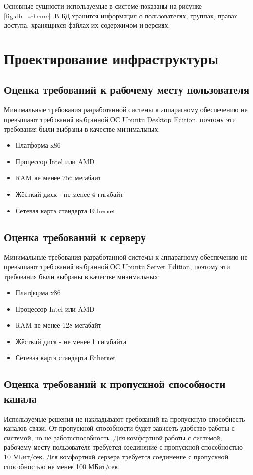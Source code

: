 \documentclass[utf8,usehyperref,12pt]{G7-32}
\begin{document}
Основные сущности используемые в системе показаны на рисунке \ref{fig:db_scheme}. В БД хранится информация о пользователях, группах, правах доступа, хранящихся файлах их содержимом и версиях.


\section{Проектирование инфраструктуры}\label{sect_infra}

\subsection{Оценка требований к рабочему месту пользователя}\label{sect_infra}
Минимальные требования разработанной системы к аппаратному обеспечению не превышают требований выбранной ОС Ubuntu Desktop Edition\cite{ubuntu_req}, поэтому эти требования были выбраны в качестве минимальных:
\begin{itemize}
 \item Платформа x86
 \item Процессор Intel или AMD
 \item RAM не менее 256 мегабайт
 \item Жёсткий диск - не менее 4 гигабайт
 \item Сетевая карта стандарта Ethernet
\end{itemize}

\subsection{Оценка требований к серверу}\label{sect_infra}

Минимальные требования разработанной системы к аппаратному обеспечению не превышают требований выбранной ОС Ubuntu Server Edition\cite{ubuntu_server_req}, поэтому эти требования были выбраны в качестве минимальных:
\begin{itemize}
 \item Платформа x86
 \item Процессор Intel или AMD
 \item RAM не менее 128 мегабайт
 \item Жёсткий диск - не менее 1 гигабайта
 \item Сетевая карта стандарта Ethernet
\end{itemize}

\subsection{Оценка требований к пропускной способности канала}\label{sect_infra}
Используемые решения не накладывают требований на пропускную способность каналов связи. От пропускной способности будет зависеть удобство работы с системой, но не работоспособность. Для комфортной работы с системой, рабочему месту пользователя требуется соединение с пропускной способностью 10 МБит/сек. Для комфортной сервера требуется соединение с пропускной способностью не менее 100 МБит/сек.
\end{document}

